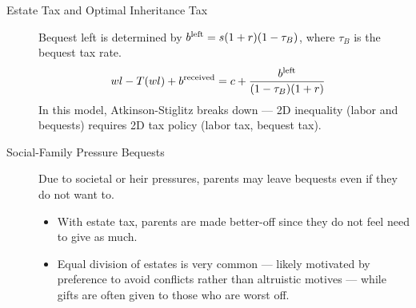 \documentclass[10pt]{extarticle}
\begin{document}
\begin{problem}{Estate Tax and Optimal Inheritance Tax}
\begin{description}
        Bequest left is determined by $b^{\small\text{left}} = s(1+r)(1-\tau_B)$, where $\tau_B$ is the bequest tax rate.
        \begin{align*}
          wl-T(wl) + b^{\small\text{received}} &= c + \frac{b^{\text{left}}}{(1-\tau_B)(1+r)}
        \end{align*}
        In this model, Atkinson-Stiglitz breaks down --- 2D inequality (labor and bequests) requires 2D tax policy (labor tax, bequest tax).
      \item[Social-Family Pressure Bequests] Due to societal or heir pressures, parents may leave bequests even if they do not want to.
        \begin{itemize}
          \item With estate tax, parents are made better-off since they do not feel need to give as much.
          \item Equal division of estates is very common --- likely motivated by preference to avoid conflicts rather than altruistic motives --- while gifts are often given to those who are worst off.
        \end{itemize}
    \end{description}
  \end{problem}
\end{document}
